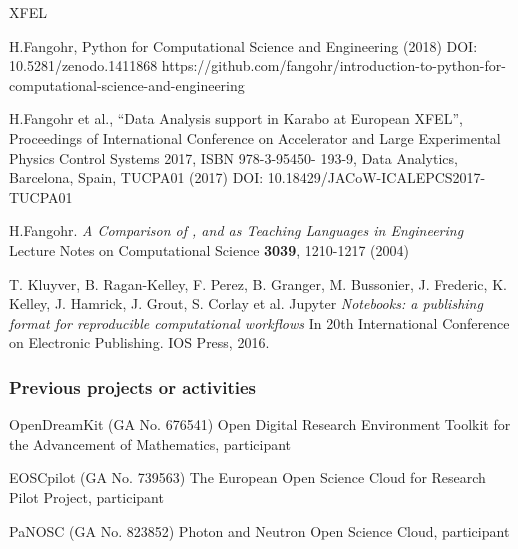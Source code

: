 \begin{sitedescription}{XFEL}
\begin{compactenum}
\item H.Fangohr, Python for Computational Science and Engineering
  (2018) DOI: 10.5281/zenodo.1411868 \newline
  https://github.com/fangohr/introduction-to-python-for-computational-science-and-engineering
\item H.Fangohr et al., “Data Analysis support in Karabo at European
  XFEL”, Proceedings of International Conference on Accelerator and
  Large Experimental Physics Control Systems 2017, ISBN 978-3-95450-
  193-9, Data Analytics, Barcelona, Spain, TUCPA01 (2017) DOI: 10.18429/JACoW-ICALEPCS2017-TUCPA01
\item H.Fangohr.
\emph{A Comparison of , \Matlab and \Python as Teaching Languages in Engineering}
Lecture Notes on Computational Science \textbf{3039}, 1210-1217 (2004)
\item T. Kluyver, B. Ragan-Kelley, F. Perez, B. Granger, M. Bussonier, J. Frederic, K. Kelley, J. Hamrick, J. Grout, S. Corlay et al. Jupyter
\emph{Notebooks: a publishing format for reproducible computational workflows} In 20th International Conference on Electronic Publishing. IOS Press, 2016.
\end{compactenum}

\subsubsection*{Previous projects or activities}

\begin{compactenum}
\item OpenDreamKit (GA No. 676541) Open Digital Research Environment
  Toolkit for the Advancement of Mathematics, participant
\item EOSCpilot (GA No. 739563) The European Open Science Cloud for
  Research Pilot Project, participant
\item PaNOSC (GA No. 823852) Photon and Neutron Open Science Cloud, participant
\end{compactenum}

\end{sitedescription}







